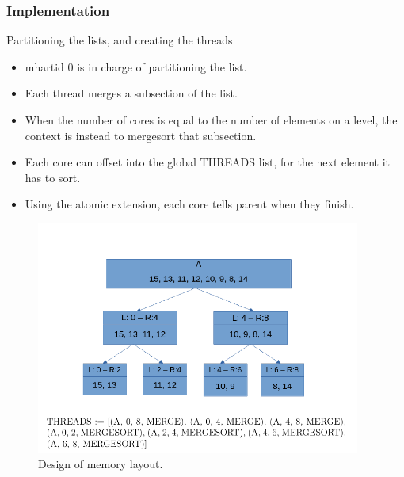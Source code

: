 \begin{frame}[hoved]
	\frametitle{Implementation}
	\begin{minipage}[t]{0.45\textwidth}
		{\large Partitioning the lists, and creating the threads}
		\begin{itemize}
			\item mhartid 0 is in charge of partitioning the list.
			\item Each thread merges a subsection of the list.
			\item When the number of cores is equal to the number of elements on a
			      level, the context is instead to mergesort that subsection.
			\item Each core can offset into the global THREADS list, for the next
			      element it has to sort.
			\item Using the atomic extension, each core tells parent when they finish.
		\end{itemize}
	\end{minipage}
	\hfill
	\begin{minipage}[t]{0.45\textwidth}
		\begin{figure}
			\begin{center}
				\includegraphics[width=0.95\textwidth]{figures/partitioning.png}
			\end{center}
			\caption{Design of memory layout.}\label{fig:partition}
		\end{figure}
	\end{minipage}
\end{frame}
